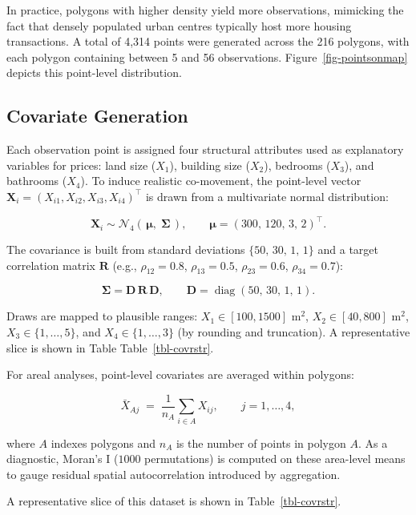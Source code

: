 \documentclass[a4paper,reqno]{amsart}
\begin{document}
In practice, polygons with higher density yield more observations,
mimicking the fact that densely populated urban centres typically host
more housing transactions. A total of 4,314 points were generated across
the 216 polygons, with each polygon containing between 5 and 56
observations. Figure~\ref{fig-pointsonmap} depicts this
point-level distribution.

\subsection{Covariate Generation}\label{covariate-generation}

Each observation point is assigned four structural attributes used as
explanatory variables for prices: land size (\(X_1\)), building size
(\(X_2\)), bedrooms (\(X_3\)), and bathrooms (\(X_4\)). To induce
realistic co-movement, the point-level vector
\(\mathbf{X}_i=(X_{i1},X_{i2},X_{i3},X_{i4})^\top\) is drawn from a
multivariate normal distribution:

\[
\mathbf{X}_i \sim \mathcal N_4(\,\boldsymbol\mu,\;\boldsymbol\Sigma\,), 
\qquad 
\boldsymbol\mu = (300,\,120,\,3,\,2)^\top .
\]

The covariance is built from standard deviations \(\{50,\,30,\,1,\,1\}\)
and a target correlation matrix \(\mathbf R\) (e.g., \(\rho_{12}=0.8\),
\(\rho_{13}=0.5\), \(\rho_{23}=0.6\), \(\rho_{34}=0.7\)):

\[
\boldsymbol\Sigma = \mathbf D\,\mathbf R\,\mathbf D ,
\qquad \mathbf D=\operatorname{diag}(50,\,30,\,1,\,1).
\]

Draws are mapped to plausible ranges: \(X_1\in[100,1500]\) m\(^2\),
\(X_2\in[40,800]\) m\(^2\), \(X_3\in\{1,\dots,5\}\), and
\(X_4\in\{1,\dots,3\}\) (by rounding and truncation). A representative
slice is shown in Table Table~\ref{tbl-covrstr}.

For areal analyses, point-level covariates are averaged within polygons:

\[
\bar X_{Aj} \;=\; \frac{1}{n_A}\sum_{i\in A} X_{ij}, \qquad j=1,\ldots,4,
\]

where \(A\) indexes polygons and \(n_A\) is the number of points in
polygon \(A\). As a diagnostic, Moran's I (\(1000\) permutations) is
computed on these area-level means to gauge residual spatial
autocorrelation introduced by aggregation.

A representative slice of this dataset is shown in
Table~\ref{tbl-covrstr}.

\begingroup\fontsize{9}{11}\selectfont
\end{document}
